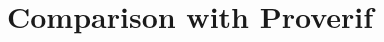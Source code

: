 \documentclass[target=bach,aauheader=]{thud}
\begin{document}
\chapter{Comparison with Proverif}



\backmatter




\end{document}

